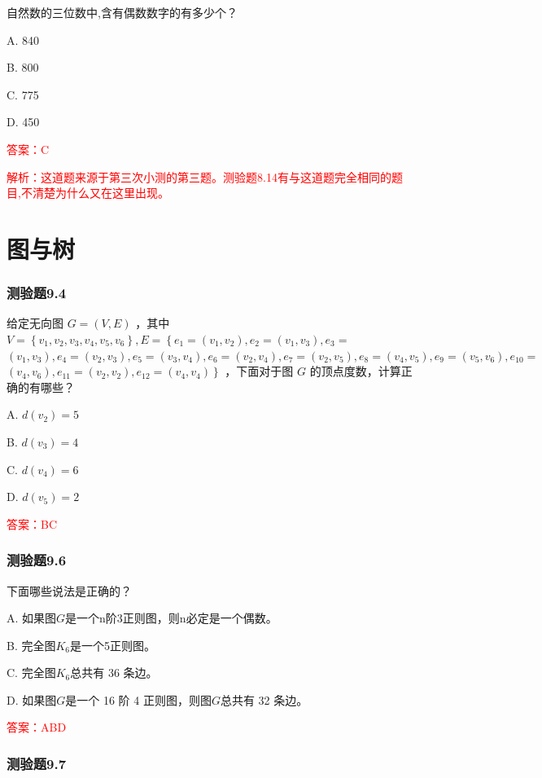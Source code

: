 \documentclass[UTF8, heading=true]{ctexart}
\begin{document}
自然数的三位数中,含有偶数数字的有多少个？

A. 840

B. 800

C. 775

D. 450

\textcolor{red}{答案：C}

\textcolor{red}{解析：这道题来源于第三次小测的第三题。测验题8.14有与这道题完全相同的题目,不清楚为什么又在这里出现。}



\clearpage

\section{图与树}


\subsubsection{测验题9.4}

给定无向图 $G=(V, E)$ ，其中 $V=\left\{v_1, v_2, v_3, v_4, v_5, v_6\right\}, E=\left\{e_1=\left(v_1, v_2\right), e_2=\left(v_1, v_3\right), e_3=\right.$ $\left(v_1, v_3\right), e_4=\left(v_2, v_3\right), e_5=\left(v_3, v_4\right), e_6=\left(v_2, v_4\right), e_7=\left(v_2, v_5\right), e_8=\left(v_4, v_5\right), e_9=\left(v_5, v_6\right), e_{10}=$ $\left.\left(v_4, v_6\right), e_{11}=\left(v_2, v_2\right), e_{12}=\left(v_4, v_4\right)\right\}$ ，下面对于图 $G$ 的顶点度数，计算正确的有哪些？

A. $d\left(v_2\right)=5$

B. $d\left(v_3\right)=4$

C. $d\left(v_4\right)=6$

D. $ d\left(v_5\right)=2$

\textcolor{red}{答案：BC}

\subsubsection{测验题9.6}

下面哪些说法是正确的？

A. 如果图$G$是一个n阶3正则图，则n必定是一个偶数。

B. 完全图$K_6$是一个5正则图。

C. 完全图$K_6$总共有 36 条边。

D. 如果图$G$是一个 16 阶 4 正则图，则图$G$总共有 32 条边。

\textcolor{red}{答案：ABD}

\subsubsection{测验题9.7}
\end{document}
